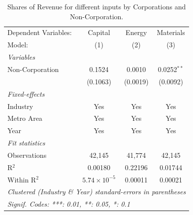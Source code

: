 \documentclass[
  12pt]{article}
\theoremstyle{definition}
\theoremstyle{remark}
\begin{document}
\begin{table}

\caption{\label{tbl-reg-shares}Shares of Revenue for different inputs by
Corporations and Non-Corporation.}

\begin{minipage}{\linewidth}

\begingroup
\centering
\begin{tabular}{lccc}
   \tabularnewline \midrule \midrule
   Dependent Variables: & Capital               & Energy   & Materials\\  
   Model:               & (1)                   & (2)      & (3)\\  
   \midrule
   \emph{Variables}\\
   Non-Corporation      & 0.1524                & 0.0010   & 0.0252$^{**}$\\   
                        & (0.1063)              & (0.0019) & (0.0092)\\   
   \midrule
   \emph{Fixed-effects}\\
   Industry             & Yes                   & Yes      & Yes\\  
   Metro Area           & Yes                   & Yes      & Yes\\  
   Year                 & Yes                   & Yes      & Yes\\  
   \midrule
   \emph{Fit statistics}\\
   Observations         & 42,145                & 41,774   & 42,145\\  
   R$^2$                & 0.00180               & 0.22196  & 0.01744\\  
   Within R$^2$         & $5.74\times 10^{-5}$  & 0.00011  & 0.00021\\  
   \midrule \midrule
   \multicolumn{4}{l}{\emph{Clustered (Industry \& Year) standard-errors in parentheses}}\\
   \multicolumn{4}{l}{\emph{Signif. Codes: ***: 0.01, **: 0.05, *: 0.1}}\\
\end{tabular}
\par\endgroup

\end{minipage}%

\end{table}%
\end{document}
